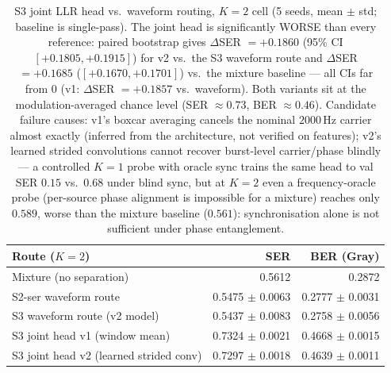 \begin{table}[H]
\centering
\caption{S3 joint LLR head vs.\ waveform routing, $K{=}2$ cell (5 seeds, mean $\pm$ std; baseline is single-pass). The joint head is significantly WORSE than every reference: paired bootstrap gives $\Delta$SER ${=}+0.1860$ (95\% CI $[+0.1805, +0.1915]$) for v2 vs.\ the S3 waveform route and $\Delta$SER ${=}+0.1685$ ($[+0.1670, +0.1701]$) vs.\ the mixture baseline --- all CIs far from 0 (v1: $\Delta$SER ${=}+0.1857$ vs.\ waveform). Both variants sit at the modulation-averaged chance level (SER $\approx 0.73$, BER $\approx 0.46$). Candidate failure causes: v1's boxcar averaging cancels the nominal $2000$\,Hz carrier almost exactly (inferred from the architecture, not verified on features); v2's learned strided convolutions cannot recover burst-level carrier/phase blindly --- a controlled $K{=}1$ probe with oracle sync trains the same head to val SER $0.15$ vs.\ $0.68$ under blind sync, but at $K{=}2$ even a frequency-oracle probe (per-source phase alignment is impossible for a mixture) reaches only $0.589$, worse than the mixture baseline ($0.561$): synchronisation alone is not sufficient under phase entanglement.}
\label{tab:s3}
\setlength{\tabcolsep}{4pt}
\footnotesize
\begin{tabular}{l r r}
\toprule
Route ($K{=}2$) & SER & BER (Gray) \\
\midrule
Mixture (no separation) & 0.5612 & 0.2872 \\
S2-ser waveform route & 0.5475 $\pm$ 0.0063 & 0.2777 $\pm$ 0.0031 \\
S3 waveform route (v2 model) & 0.5437 $\pm$ 0.0083 & 0.2758 $\pm$ 0.0056 \\
S3 joint head v1 (window mean) & 0.7324 $\pm$ 0.0021 & 0.4668 $\pm$ 0.0015 \\
S3 joint head v2 (learned strided conv) & 0.7297 $\pm$ 0.0018 & 0.4639 $\pm$ 0.0011 \\
\bottomrule
\end{tabular}
\end{table}
